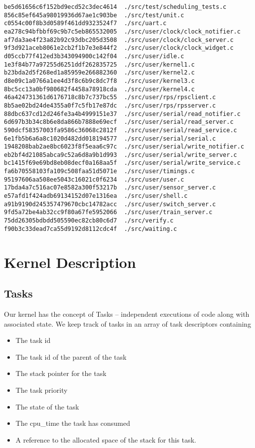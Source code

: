 \documentclass{article}
\begin{document}
\begin{verbatim}
be5d61656c6f152bd9ecd52c3dec4614  ./src/test/scheduling_tests.c
856c85ef645a98019936d67ae1c903be  ./src/test/unit.c
c0554c00f8b3d0589f461dd9323524f7  ./src/uart.c
ea278c94bfbbf69c9b7c5eb865532005  ./src/user/clock/clock_notifier.c
af7da3ae4f23a82b92c93dbc205d3508  ./src/user/clock/clock_server.c
9f3d921aceb8061e2cb2f1b7e3e844f2  ./src/user/clock/clock_widget.c
d05ccb77f412ed3b343094900c142f04  ./src/user/idle.c
1e3f84b77a97255d6251ddf262835725  ./src/user/kernel1.c
b23bda2d5f268ed1a85959e266882360  ./src/user/kernel2.c
d8e09c1a0766a1ee4d3f8c6b9c8dc7f8  ./src/user/kernel3.c
8bc5cc13a0bf980682f4458a78918cda  ./src/user/kernel4.c
46a424731361d6176718c8b7c737bc55  ./src/user/rps/rpsclient.c
8b5ae02bd24de4355a0f7c5fb17e87dc  ./src/user/rps/rpsserver.c
88dbc637cd12d246fe3a4b4999151e37  ./src/user/serial/read_notifier.c
6d697b3b34c8b6e8da866b7888e69ecf  ./src/user/serial/read_server.c
590dcf58357003fa9586c36068c2812f  ./src/user/serial/read_service.c
6e1fb5b6a6a8c1020d482dd018194577  ./src/user/serial/serial.c
1948208bab2ae8bc6023f8f5eaa6c97c  ./src/user/serial/write_notifier.c
eb2bf4d21085abca9c52a6d8a9b1d993  ./src/user/serial/write_server.c
bc1415f69e69bd8eb08decf0a168aa5f  ./src/user/serial/write_service.c
fa6b70558103fa109c508faa51d5071e  ./src/user/timings.c
95197606aa508ee5043c16021c0f6234  ./src/user/user.c
17bda4a7c516ac07e8582a300f53217b  ./src/user/sensor_server.c
e57afd1f424adb69134152d07e1316ea  ./src/user/shell.c
a91b9190d245357479670cbc14782acc  ./src/user/switch_server.c
9fd5a72be4ab32cc9f80a67fe5952066  ./src/user/train_server.c
75dd26305bdbdd505590ec82cb80c6d7  ./src/verify.c
f90b3c33dead7ca55d9192d8112cdc4f  ./src/waiting.c
\end{verbatim}

\section{Kernel Description}

\subsection{Tasks}

Our kernel has the concept of Tasks -- independent executions of code along with associated state. We keep track of tasks in an array of task descriptors containing

\begin{itemize}
  \item The task id
  \item The task id of the parent of the task
  \item The stack pointer for the task
  \item The task priority
  \item The state of the task
  \item The cpu\_time the task has consumed
  \item A reference to the allocated space of the stack for this task.
\end{itemize}
\end{document}
